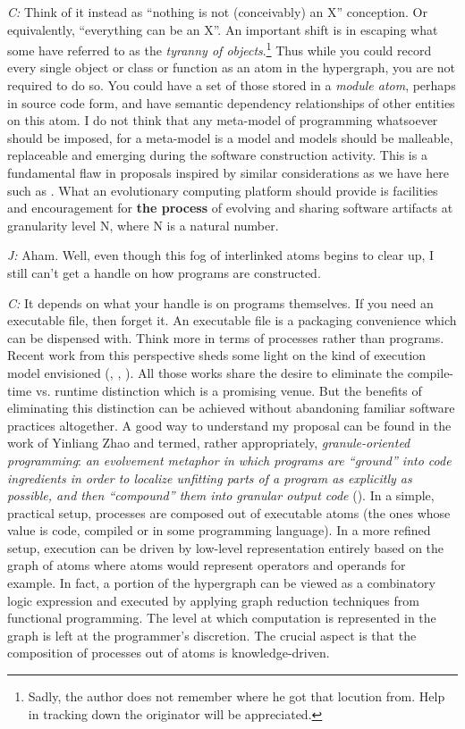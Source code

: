 \documentclass[10pt]{sigplanconf}
\begin{document}
\emph{C:} Think of it instead as ``nothing is not (conceivably) an X'' conception. Or equivalently, ``everything can be an X''. An important shift is in escaping what some have referred to as the \emph{tyranny of objects}.\footnote{Sadly, the author does not remember where he got that locution from. Help in tracking down the originator will be appreciated.} Thus while you could record every single object or class or function as an atom in the hypergraph, you are not required to do so. You could have a set of those stored in a \emph{module atom}, perhaps in source code form, and have semantic dependency relationships of other entities on this atom. I do not think that any meta-model of programming whatsoever should be imposed, for a meta-model is a model and models should be malleable, replaceable and emerging during the software construction activity. This is a fundamental flaw in proposals inspired by similar considerations as we have here such as \cite{imbusch}. What an evolutionary computing platform should provide is facilities and encouragement for \textbf{the process} of evolving and sharing software artifacts at granularity level N, where N is a natural number.

\emph{J:} Aham. Well, even though this fog of interlinked atoms begins to clear up, I still can't get a handle on how programs are constructed.

\emph{C:} It depends on what your handle is on programs themselves. If you need an executable file, then forget it. An executable file is a packaging convenience which can be dispensed with. Think more in terms of processes rather than programs. Recent work from this perspective sheds some light on the kind of execution model envisioned (\cite{elliott}, \cite{edwards}, \cite{perera}). All those works share the desire to eliminate the compile-time vs. runtime distinction which is a promising venue. But the benefits of eliminating this distinction can be achieved without abandoning familiar software practices altogether. A good way to understand my proposal can be found in the work of Yinliang Zhao and termed, rather appropriately, \emph{granule-oriented programming}: \emph{an evolvement metaphor in which programs are ``ground'' into code ingredients in order to localize unfitting parts of a program as explicitly as possible, and then ``compound'' them into granular output code} (\cite{zhao}). In a simple, practical setup, processes are composed out of executable atoms (the ones whose value is code, compiled or in some programming language). In a more refined setup, execution can be driven by low-level representation entirely based on the graph of atoms where atoms would represent operators and operands for example. In fact, a portion of the hypergraph can be viewed as a combinatory logic expression and executed by applying graph reduction techniques from functional programming. The level at which computation is represented in the graph is left at the programmer's discretion. The crucial aspect is that the composition of processes out of atoms is knowledge-driven.
\end{document}

